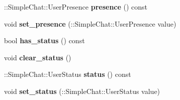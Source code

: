 \begin{DoxyCompactItemize}
\item 
\hypertarget{classSimpleChat_1_1User_a381ff8f5de1705967badcbd4d67d969b}{\-::Simple\-Chat\-::\-User\-Presence {\bfseries presence} () const }\label{classSimpleChat_1_1User_a381ff8f5de1705967badcbd4d67d969b}

\item 
\hypertarget{classSimpleChat_1_1User_abce18e8edb234ff2720525d9648377f1}{void {\bfseries set\-\_\-presence} (\-::Simple\-Chat\-::\-User\-Presence value)}\label{classSimpleChat_1_1User_abce18e8edb234ff2720525d9648377f1}

\item 
\hypertarget{classSimpleChat_1_1User_a0d3fabf6fe4fdb07bf490de3532f4853}{bool {\bfseries has\-\_\-status} () const }\label{classSimpleChat_1_1User_a0d3fabf6fe4fdb07bf490de3532f4853}

\item 
\hypertarget{classSimpleChat_1_1User_a50472728102691f22a1908831566956e}{void {\bfseries clear\-\_\-status} ()}\label{classSimpleChat_1_1User_a50472728102691f22a1908831566956e}

\item 
\hypertarget{classSimpleChat_1_1User_a0d7fc30246e8605a32a1cbaef5055a49}{\-::Simple\-Chat\-::\-User\-Status {\bfseries status} () const }\label{classSimpleChat_1_1User_a0d7fc30246e8605a32a1cbaef5055a49}

\item 
\hypertarget{classSimpleChat_1_1User_a6da4a04d2a3ac63b5d389a1ab4cb53c6}{void {\bfseries set\-\_\-status} (\-::Simple\-Chat\-::\-User\-Status value)}\label{classSimpleChat_1_1User_a6da4a04d2a3ac63b5d389a1ab4cb53c6}

\end{DoxyCompactItemize}

